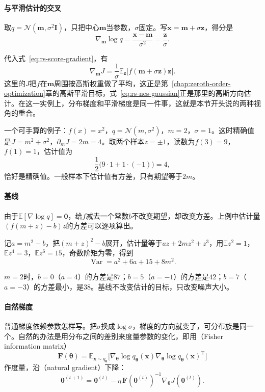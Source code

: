 \paragraph{与平滑估计的交叉}
取$q=\mathcal{N}(\bm{m},\sigma^2\bm{I})$，只把中心$\bm{m}$当参数，$\sigma$固定。写$\bm{x}=\bm{m}+\sigma\bm{z}$，得分是
\[
 \nabla_{\bm{m}}\log q=\frac{\bm{x}-\bm{m}}{\sigma^2}=\frac{\bm{z}}{\sigma}.
\]

代入式~\eqref{eq:rs-score-gradient}，有
\begin{equation}
 \nabla_{\bm{m}}J=\frac{1}{\sigma}\mathbb{E}_{\bm{z}}\bigl[f(\bm{m}+\sigma\bm{z})\bm{z}\bigr].
 \label{eq:rs-nes-gaussian}
\end{equation}
这里的$J$把$f$在$\bm{m}$周围按高斯权重做了平均，这正是第~\ref{chap:zeroth-order-optimization}章的高斯平滑目标，式~\eqref{eq:rs-nes-gaussian}正是那里的高斯方向估计。在这一实例上，分布梯度和平滑梯度是同一件事，这就是本节开头说的两种视角的重合。

一个可手算的例子：$f(x)=x^2$，$q=\mathcal{N}(m,\sigma^2)$，$m=2$，$\sigma=1$。这时精确值是$J=m^2+\sigma^2$，$\partial_mJ=2m=4$。取两个样本$z=\pm1$，读数为$f(3)=9$，$f(1)=1$，估计值为
\[
 \frac12\bigl(9\cdot1+1\cdot(-1)\bigr)=4,
\]
恰好是精确值。一般样本下估计值有方差，只有期望等于$2m$。

\paragraph{基线}
由于$\mathbb{E}[\nabla\log q]=\bm{0}$，给$f$减去一个常数$b$不改变期望，却改变方差。上例中估计量$(f(m+z)-b)z$的方差可以逐项算出。

记$a=m^2-b$，把$(m+z)^2-b$展开，估计量等于$az+2mz^2+z^3$，用$\mathbb{E}z^2=1$，$\mathbb{E}z^4=3$，$\mathbb{E}z^6=15$，奇数阶矩为零，得到
\[
 \operatorname{Var}=a^2+6a+15+8m^2.
\]

$m=2$时，$b=0$（$a=4$）的方差是$87$；$b=5$（$a=-1$）的方差是$42$；$b=7$（$a=-3$）的方差最小，是$38$。基线不改变估计的目标，只改变噪声大小。

\paragraph{自然梯度}
普通梯度依赖参数怎样写。把$\sigma$换成$\log\sigma$，梯度的方向就变了，可分布族是同一个。自然的办法是用分布之间的差别来度量参数的变化，即用（Fisher information matrix）
\begin{equation}
 \bm{F}(\bm{\theta})=\mathbb{E}_{\bm{x}\sim q_{\bm{\theta}}}\bigl[\nabla_{\bm{\theta}}\log q_{\bm{\theta}}(\bm{x})\nabla_{\bm{\theta}}\log q_{\bm{\theta}}(\bm{x})^\top\bigr]
 \label{eq:rs-fisher}
\end{equation}
作度量，沿（natural gradient）下降：
\begin{equation}
 \bm{\theta}^{(t+1)}=\bm{\theta}^{(t)}-\eta\,\bm{F}(\bm{\theta}^{(t)})^{-1}\nabla_{\bm{\theta}}J(\bm{\theta}^{(t)}).
 \label{eq:rs-natural-gradient}
\end{equation}

